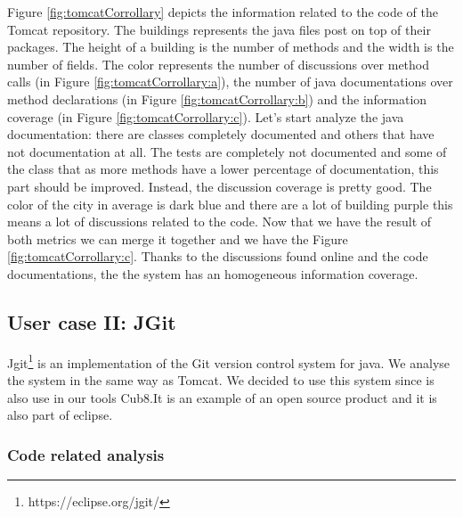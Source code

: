 \documentclass[]{usiinfbachelorproject}
\begin{document}
Figure \ref{fig:tomcatCorrollary} depicts the information related to the code of the Tomcat repository. The buildings represents the java files post on top of their packages. The height of a building is the number of methods and the width is the number of fields. The color represents the number of discussions over method calls (in Figure \ref{fig:tomcatCorrollary:a}), the number of java documentations over method declarations (in Figure \ref{fig:tomcatCorrollary:b}) and the information coverage (in Figure \ref{fig:tomcatCorrollary:c}).
Let's start analyze the java documentation: there are classes completely documented and others that have not documentation at all.
The tests are completely not documented and some of the class that as more methods have a lower percentage of documentation, this part should be improved.
Instead, the discussion coverage is pretty good. The color of the city in average is dark blue and there are a lot of building purple this means a lot of discussions related to the code. 
Now that we have the result of both metrics we can merge it together and we have the Figure \ref{fig:tomcatCorrollary:c}. Thanks to the discussions found online and the code documentations, the the system has an homogeneous information coverage.
 

 

\newpage



\subsection{User case II: JGit}
Jgit\footnote{https://eclipse.org/jgit/} is an implementation of the Git version control system for java. We analyse the system in the same way as Tomcat. We decided to use this system since is also use in our tools Cub8.It is an example of an open source product and it is also part of eclipse.


\subsubsection{Code related analysis}
\end{document}
